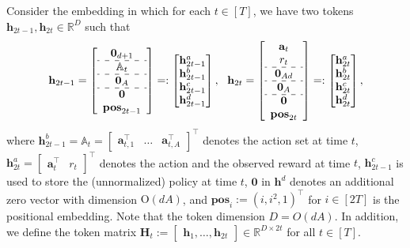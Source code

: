 \documentclass[10pt]{article}
\newcommand{\<}{\left\langle}
\renewcommand{\>}{\right\rangle}
\newcommand{\bzero}{{\mathbf 0}}
\newcommand{\R}{\mathbb{R}}
\newcommand{\posv}{{\mathbf{pos}}}
\newcommand{\parta}{{a}}
\newcommand{\partb}{{b}}
\newcommand{\partc}{{c}}
\newcommand{\partd}{{d}}
\newcommand{\totlen}{{T}}
\newcommand{\conO}{{\mathrm{O}}}
\def\sA{{\mathbb{A}}}
\def\bH{{\mathbf H}}
\def\ba{{\mathbf a}}
\def\bh{{\mathbf h}}
\begin{document}
Consider the embedding in which for each $t\in[\totlen]$, we have two tokens $\bh_{2t-1},\bh_{2t}\in\R^D$ such that
\[
\begin{aligned}
\bh_{2t-1}=
\left[
\begin{array}{c}
     \bzero_{d+1} \\
     \hdashline
     \sA_t\\  
     \hdashline
     \bzero_A\\  
     \hdashline
      \bzero\\ \posv_{2t-1}
\end{array}
\right]









=:
\begin{bmatrix}
     \bh_{2t-1}^{\parta} \\  \bh_{2t-1}^{\partb}\\  \bh_{2t-1}^{\partc}\\   \bh_{2t-1}^{\partd}\\
\end{bmatrix},~~
\bh_{2t}=
\left[
\begin{array}{cc}
     \ba_{t} \\
      r_t\\  
      \hdashline
       \bzero_{Ad}\\ 
       \hdashline 
       \bzero_{A}\\ 
       \hdashline  
       \bzero\\ \posv_{2t}
\end{array}
\right]=:
\begin{bmatrix}
    \bh_{2t}^{\parta} \\  \bh_{2t}^{\partb}\\   \bh_{2t}^{\partc}\\   \bh_{2t}^{\partd}
\end{bmatrix},
\end{aligned}
\]
where $\bh_{2t-1}^{\partb}=\sA_t=\begin{bmatrix}
    \ba_{t,1}^\top &\ldots & \ba_{t,A}^\top
\end{bmatrix}^\top$ denotes the action set at time $t$, $\bh_{2t}^{\parta}=\begin{bmatrix}
    \ba_t^\top &r_t
\end{bmatrix}^\top$ denotes the action and the observed reward at time $t$, $\bh^\partc_{2t-1}$ is used to store the (unnormalized) policy at time  $t$, $\bzero$ in $\bh^\partd$ denotes an additional zero vector with  dimension $\conO(dA)$, and $\posv_i:=(i,i^2,1)^\top$ for $i\in[2\totlen]$ is the positional embedding.    Note that the token dimension $D= O(dA)$. In addition, we define the token matrix $\bH_t:=\begin{bmatrix}
    \bh_1,\ldots,\bh_{2t}
\end{bmatrix}\in\R^{D\times 2t}$ for all $t\in[\totlen]$.
\end{document}
